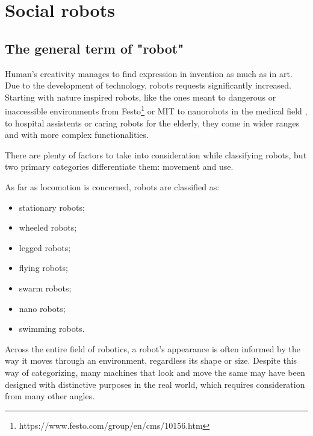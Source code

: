 \documentclass[runningheads,a4paper,12pt]{report}
\begin{document}
\section{Social robots}
\label{chapter:social}

\subsection{The general term of "robot"}
Human's creativity manages to find expression in invention as much as in art. Due to the development of technology, robots requests significantly increased. Starting with nature inspired robots, like the ones meant to dangerous or inaccessible environments from Festo\footnote{https://www.festo.com/group/en/cms/10156.htm} or MIT \cite{mit} to nanorobots in the medical field \cite{microrobots}, to hospital assistents or caring robots for the elderly, they come in wider ranges and with more complex functionalities. 

There are plenty of factors to take into consideration while classifying robots, but two primary categories differentiate them: movement and use.

As far as locomotion is concerned, robots are classified as:
\begin{multicols}{2}
\begin{itemize}
\item stationary robots;
\item wheeled robots;
\item legged robots;
\item flying robots;
\item swarm robots;
\item nano robots;
\item swimming robots.
\end{itemize}
\end{multicols}

Across the entire field of robotics, a robot's appearance is often informed by the way it moves through an environment, regardless its shape or size. Despite this way of categorizing, many machines that look and move the same may have been designed with distinctive purposes in the real world, which requires consideration from many other angles.
\end{document}
